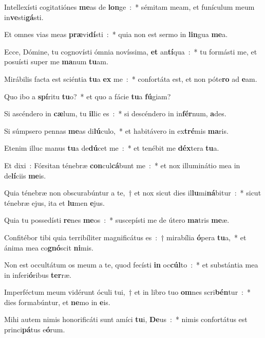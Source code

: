 ﻿\item Intellexísti cogitatiónes \textbf{me}\-as de \textbf{lon}\-ge~:~* sémitam meam, et funículum meum in\textbf{ve}\-sti\textbf{gá}\-sti.
\item Et omnes vias meas \textbf{præ}\-vi\textbf{dí}\-sti~:~* quia non est sermo in \textbf{lin}\-gua \textbf{me}\-a.
\item Ecce, Dómine, tu cognovísti ómnia novíssima, \textbf{et} an\textbf{tí}\-qua~:~* tu formásti me, et posuísti super me \textbf{ma}\-num \textbf{tu}\-am.
\item Mirábilis facta est sciéntia \textbf{tu}\-a \textbf{ex} me~:~* confortáta est, et non póte\textbf{ro} ad \textbf{e}\-am.
\item Quo ibo a \textbf{spí}\-ritu \textbf{tu}\-o?~* et quo a fácie \textbf{tu}\-a \textbf{fú}\-giam?
\item Si ascéndero in \textbf{cæ}\-lum, tu \textbf{il}\-lic es~:~* si descéndero in in\textbf{fér}\-num, \textbf{a}\-des.
\item Si súmpsero pennas \textbf{me}\-as di\textbf{lú}\-culo,~* et habitávero in ex\textbf{tré}\-mis \textbf{ma}\-ris.
\item Etenim illuc manus \textbf{tu}\-a de\textbf{dú}\-cet me~:~* et tenébit me \textbf{déx}\-tera \textbf{tu}\-a.
\item Et dixi~: Fórsitan ténebræ \textbf{con}\-cul\textbf{cá}\-bunt me~:~* et nox illuminátio mea in de\textbf{lí}\-ciis \textbf{me}\-is.
\item Quia ténebræ non obscurabúntur a te,~† et nox sicut dies il\textbf{lu}\-mi\textbf{ná}\-bitur~:~* sicut ténebræ ejus, ita et \textbf{lu}\-men \textbf{e}\-jus.
\item Quia tu possedísti \textbf{re}\-nes \textbf{me}\-os~:~* suscepísti me de útero \textbf{ma}\-tris \textbf{me}\-æ.
\item Confitébor tibi quia terribíliter magnificátus es~:~† mirabília \textbf{ó}\-pera \textbf{tu}\-a,~* et ánima mea co\textbf{gnó}\-scit \textbf{ni}\-mis.
\item Non est occultátum os meum a te, quod fecísti \textbf{in} oc\textbf{cúl}\-to~:~* et substántia mea in inferi\textbf{ó}\-ribus \textbf{ter}\-ræ.
\item Imperféctum meum vidérunt óculi tui,~† et in libro tuo \textbf{om}\-nes scri\textbf{bén}\-tur~:~* dies formabúntur, et \textbf{ne}\-mo in \textbf{e}\-is.
\item Mihi autem nimis honorificáti sunt amíci \textbf{tu}\-i, \textbf{De}\-us~:~* nimis confortátus est princi\textbf{pá}\-tus e\textbf{ó}\-rum.
